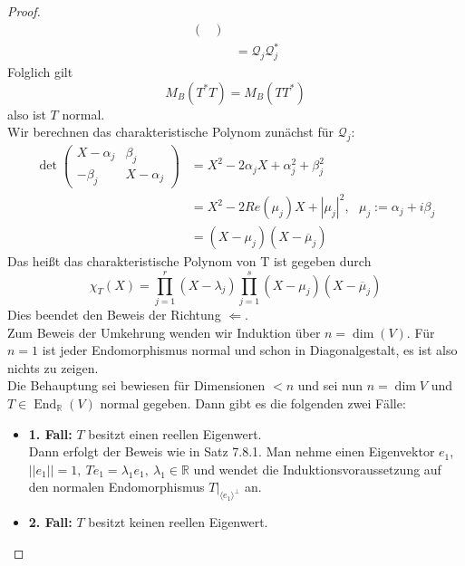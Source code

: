 \documentclass[12pt,a4paper]{article}
\theoremstyle{definition}
\theoremstyle{remark}
\renewcommand{\bar}[1]{\overline{#1}}
\DeclareMathOperator{\End}{End}
\begin{document}
\begin{proof}
\begin{equation}
\begin{split}
\begin{pmatrix}
				\end{pmatrix} \\
				&= \mathcal{Q}_j \mathcal{Q}_j^* 
			\end{split}
		\end{equation}
		Folglich gilt 
		\begin{equation}
			M_B(T^*T) = M_B(TT^*)
		\end{equation}
		also ist $T$ normal. \\
		Wir berechnen das charakteristische Polynom zunächst für $\mathcal{Q}_j$: \\
		\begin{equation}
			\begin{split}
				\det\begin{pmatrix}
					X - \alpha_j & \beta_j \\
					-\beta_j & X- \alpha_j
				\end{pmatrix} &= X^2-2\alpha_jX+\alpha_j^2+\beta_j^2 \\
				&= X^2 - 2 Re(\mu_j)X+ |\mu_j|^2, \ \ \  \mu_j := \alpha_j + i \beta_j \\
				&= (X- \mu_j) (X- \bar{\mu}_j)
			\end{split}
		\end{equation}
		Das heißt das charakteristische Polynom von T ist gegeben durch
		\begin{equation}
			\chi_T(X) = \prod\limits_{j=1}^r (X-\lambda_j) \prod\limits_{j=1}^s (X-\mu_j)(X-\bar{\mu}_j)
		\end{equation}
		Dies beendet den Beweis der Richtung $\Leftarrow$. \\
		Zum Beweis der Umkehrung wenden wir Induktion über $n = \dim (V)$. Für $n=1$ ist jeder Endomorphismus normal und schon in Diagonalgestalt, es ist also nichts zu zeigen. \\
		Die Behauptung sei bewiesen für Dimensionen $<n$ und sei nun $n=\dim V$ und $T \in \End_{\mathbb{R}}(V)$ normal gegeben. Dann gibt es die folgenden zwei Fälle: \\
		\begin{itemize}
			\item \textbf{1. Fall:} $T$ besitzt einen reellen Eigenwert.\\
				Dann erfolgt der Beweis wie in Satz 7.8.1. Man nehme einen Eigenvektor $e_1$, $||e_1||=1, \ Te_1 = \lambda_1 e_1, \ \lambda_1 \in \mathbb{R}$ und wendet die Induktionsvoraussetzung auf den normalen Endomorphismus $T|_{\langle e_1 \rangle^{\perp}}$ an.
			\item \textbf{2. Fall:} $T$ besitzt keinen reellen Eigenwert. \\

\end{itemize}
\end{proof}
\end{document}
